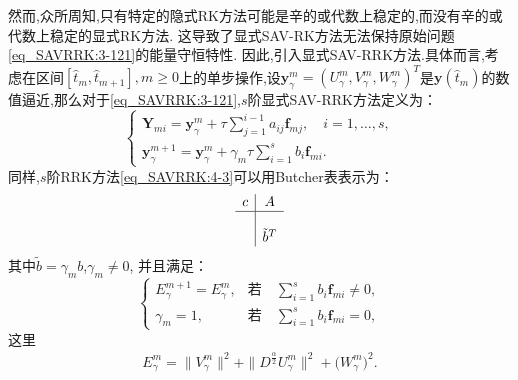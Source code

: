 然而,众所周知,只有特定的隐式RK方法可能是辛的或代数上稳定的,而没有辛的或代数上稳定的显式RK方法.
这导致了显式SAV-RK方法无法保持原始问题\eqref{eq_SAVRRK:3-121}的能量守恒特性.
因此,引入显式SAV-RRK方法.具体而言,考虑在区间$\left[\hat{t}_m, \hat{t}_{m+1}\right], m \geq 0$上的单步操作,设$\bm{y}_\gamma^m=\left(U^{m}_{\gamma},V^{m}_{\gamma},W^{m}_{\gamma}\right)^T$是$\bm{y}\left(\hat{t}_m\right)$的数值逼近,那么对于\eqref{eq_SAVRRK:3-121},$s$阶显式SAV-RRK方法定义为：
\begin{equation}
\left\{\begin{array}{l}
\bm{Y}_{m i}=\bm{y}_\gamma^m+\tau \sum\limits_{j=1}^{i-1} a_{i j} \bm{f}_{m j}, \quad i=1, \ldots, s, \\
\bm{y}_\gamma^{m+1}=\bm{y}_\gamma^m+\gamma_m \tau \sum\limits_{i=1}^s b_i \bm{f}_{m i}.
\end{array}\right.\label{eq_SAVRRK:4-3}
\end{equation}
同样,$s$阶RRK方法\eqref{eq_SAVRRK:4-3}可以用Butcher表表示为：
\begin{equation}
\begin{array}{c|c}
c & A \\
\hline \\
& \tilde{b}^T
\end{array}
\end{equation}
其中$\tilde{b}=\gamma_m b$,$\gamma_m\neq 0$, 并且满足：
\begin{equation}
\left\{\begin{array}{ll}
E_{\gamma}^{m+1}=E_{\gamma}^{m}, & \text{若} \quad  \sum\limits_{i=1}^s b_i \bm{f}_{m i} \neq 0,\\
\gamma_m=1, & \text{若} \quad  \sum\limits_{i=1}^s b_i \bm{f}_{m i} =0,
\end{array}\right.\label{eq_SAVRRK:4-6}
\end{equation}
这里
\begin{align}\label{eq_SAVRRK:4-6b}
E_{\gamma}^{m}  =\|V_{\gamma}^{m}\|^2+\|D^\frac{\alpha}{2} U_{\gamma}^{m}\|^2+\big(W_{\gamma}^{m}\big)^2.
\end{align}

